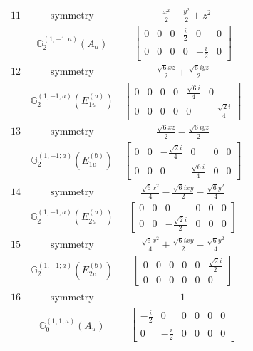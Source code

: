 \documentclass[fleqn,8pt,landscape]{jsarticle}
\begin{document}
\begin{longtable}{ccc}
$ 11 $ & $ \text{symmetry} $ & $ - \frac{x^{2}}{2} - \frac{y^{2}}{2} + z^{2} $ \\
$  $ & $ \mathbb{G}_{2}^{(1,-1;a)}(A_{u}) $ & $ \begin{bmatrix} 0 & 0 & 0 & \frac{i}{2} & 0 & 0 \\ 0 & 0 & 0 & 0 & - \frac{i}{2} & 0 \end{bmatrix} $ \\ \hline
$ 12 $ & $ \text{symmetry} $ & $ \frac{\sqrt{6} x z}{2} + \frac{\sqrt{6} i y z}{2} $ \\
$  $ & $ \mathbb{G}_{2}^{(1,-1;a)}(E_{1u}^{(a)}) $ & $ \begin{bmatrix} 0 & 0 & 0 & 0 & \frac{\sqrt{6} i}{4} & 0 \\ 0 & 0 & 0 & 0 & 0 & - \frac{\sqrt{2} i}{4} \end{bmatrix} $ \\ \hline
$ 13 $ & $ \text{symmetry} $ & $ \frac{\sqrt{6} x z}{2} - \frac{\sqrt{6} i y z}{2} $ \\
$  $ & $ \mathbb{G}_{2}^{(1,-1;a)}(E_{1u}^{(b)}) $ & $ \begin{bmatrix} 0 & 0 & - \frac{\sqrt{2} i}{4} & 0 & 0 & 0 \\ 0 & 0 & 0 & \frac{\sqrt{6} i}{4} & 0 & 0 \end{bmatrix} $ \\ \hline
$ 14 $ & $ \text{symmetry} $ & $ \frac{\sqrt{6} x^{2}}{4} - \frac{\sqrt{6} i x y}{2} - \frac{\sqrt{6} y^{2}}{4} $ \\
$  $ & $ \mathbb{G}_{2}^{(1,-1;a)}(E_{2u}^{(a)}) $ & $ \begin{bmatrix} 0 & 0 & 0 & 0 & 0 & 0 \\ 0 & 0 & - \frac{\sqrt{2} i}{2} & 0 & 0 & 0 \end{bmatrix} $ \\ \hline
$ 15 $ & $ \text{symmetry} $ & $ \frac{\sqrt{6} x^{2}}{4} + \frac{\sqrt{6} i x y}{2} - \frac{\sqrt{6} y^{2}}{4} $ \\
$  $ & $ \mathbb{G}_{2}^{(1,-1;a)}(E_{2u}^{(b)}) $ & $ \begin{bmatrix} 0 & 0 & 0 & 0 & 0 & \frac{\sqrt{2} i}{2} \\ 0 & 0 & 0 & 0 & 0 & 0 \end{bmatrix} $ \\ \hline
$ 16 $ & $ \text{symmetry} $ & $ 1 $ \\
$  $ & $ \mathbb{G}_{0}^{(1,1;a)}(A_{u}) $ & $ \begin{bmatrix} - \frac{i}{2} & 0 & 0 & 0 & 0 & 0 \\ 0 & - \frac{i}{2} & 0 & 0 & 0 & 0 \end{bmatrix} $ \\ \hline

\end{longtable}
\end{document}
